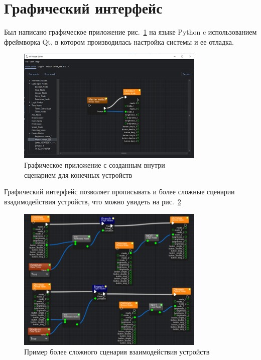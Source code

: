 \documentclass[14pt, a4paper]{extreport}
\begin{document}
\section{Графический интерфейс}
Был написано графическое приложение рис.~\ref{fig:GUI_base} на языке Python c использованием фреймворка Qt, в котором производилась настройка системы и ее отладка.

\begin{figure}[ht]
    \centering
    \includegraphics[width=0.8\textwidth]{images/Fig11.png}
    \captionsetup{justification=centering}
    \caption{Графическое приложение с созданным внутри\\сценарием для конечных устройств}
    \label{fig:GUI_base}
\end{figure}

Графический интерфейс позволяет прописывать и более сложные сценарии взадимодействия устройств, что можно увидеть на рис.~\ref{fig:GUI_adv}

\begin{figure}[ht]
    \centering
    \includegraphics[width=0.8\textwidth]{images/Fig12.png}
    \caption{Пример более сложного сценария взаимодействия устройств}
    \label{fig:GUI_adv}
\end{figure}
\end{document}
